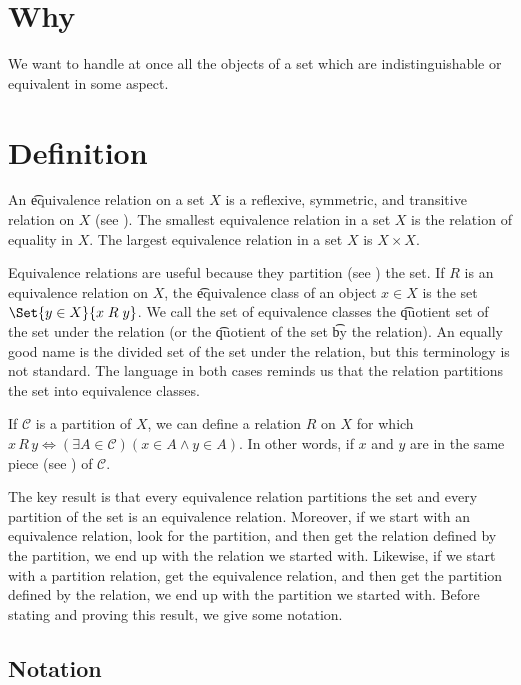 
\section*{Why}

We want to handle at once all the objects of a set which are indistinguishable or equivalent in some aspect.

\section*{Definition}

An \t{equivalence relation} on a set $X$ is a reflexive, symmetric, and transitive relation on $X$ (see ).
The smallest equivalence relation in a set $X$ is the relation of equality in $X$.
The largest equivalence relation in a set $X$ is $X \times X$.

Equivalence relations are useful because they partition (see ) the set.
If $R$ is an equivalence relation on $X$, the \t{equivalence class} of an object $x \in X$ is the set $\Set{y \in X}{x\;R\;y}$.
We call the set of equivalence classes the \t{quotient set} of the set under the relation (or the \t{quotient} of the set \t{by the relation}).
An equally good name is the divided set of the set under the relation, but this terminology is not standard.
The language in both cases reminds us that the relation partitions the set into equivalence classes.

If $\mathcal{C} $ is a partition of $X$, we can define a relation $R$ on $X$ for which $x\,R\,y \iff (\exists A \in \mathcal{C} )(x \in A \land y \in A)$.
In other words, if $x$ and $y$ are in the same piece (see ) of $\mathcal{C} $.

The key result is that every equivalence relation partitions the set and every partition of the set is an equivalence relation.
Moreover, if we start with an equivalence relation, look for the partition, and then get the relation defined by the partition, we end up with the relation we started with.
Likewise, if we start with a partition relation, get the equivalence relation, and then get the partition defined by the relation, we end up with the partition we started with.
Before stating and proving this result, we give some notation.

\subsection*{Notation}

